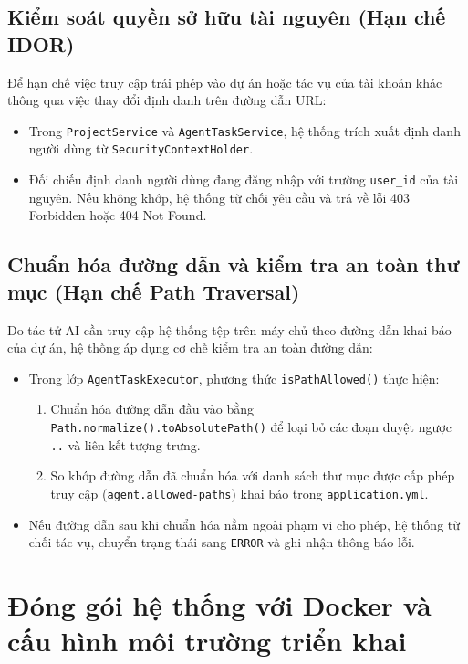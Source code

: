 \documentclass[12pt,a4paper]{report}
\begin{document}
\subsection{Kiểm soát quyền sở hữu tài nguyên (Hạn chế IDOR)}
Để hạn chế việc truy cập trái phép vào dự án hoặc tác vụ của tài khoản khác thông qua việc thay đổi định danh trên đường dẫn URL:
\begin{itemize}
    \item Trong \texttt{ProjectService} và \texttt{AgentTaskService}, hệ thống trích xuất định danh người dùng từ \texttt{SecurityContextHolder}.
    \item Đối chiếu định danh người dùng đang đăng nhập với trường \texttt{user\_id} của tài nguyên. Nếu không khớp, hệ thống từ chối yêu cầu và trả về lỗi 403 Forbidden hoặc 404 Not Found.
\end{itemize}

\subsection{Chuẩn hóa đường dẫn và kiểm tra an toàn thư mục (Hạn chế Path Traversal)}
Do tác tử AI cần truy cập hệ thống tệp trên máy chủ theo đường dẫn khai báo của dự án, hệ thống áp dụng cơ chế kiểm tra an toàn đường dẫn:
\begin{itemize}
    \item Trong lớp \texttt{AgentTaskExecutor}, phương thức \texttt{isPathAllowed()} thực hiện:
    \begin{enumerate}
        \item Chuẩn hóa đường dẫn đầu vào bằng \texttt{Path.normalize().toAbsolutePath()} để loại bỏ các đoạn duyệt ngược \texttt{..} và liên kết tượng trưng.
        \item So khớp đường dẫn đã chuẩn hóa với danh sách thư mục được cấp phép truy cập (\texttt{agent.allowed-paths}) khai báo trong \texttt{application.yml}.
    \end{enumerate}
    \item Nếu đường dẫn sau khi chuẩn hóa nằm ngoài phạm vi cho phép, hệ thống từ chối tác vụ, chuyển trạng thái sang \texttt{ERROR} và ghi nhận thông báo lỗi.
\end{itemize}

\section{Đóng gói hệ thống với Docker và cấu hình môi trường triển khai}
\end{document}
